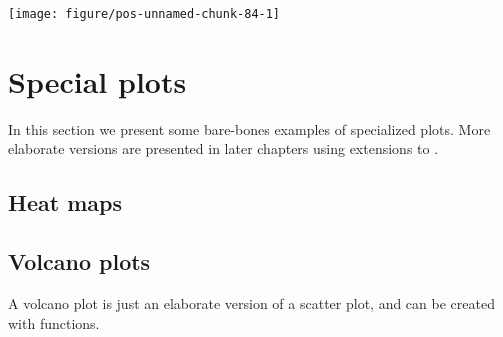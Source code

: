 \documentclass[paper=a4,headsepline,BCOR=12mm,twoside,open=right,%
titlepage,headings=small,fontsize=10pt,index=totoc,bibliography=totoc,%
captions=tableheading,captions=nooneline]{scrbook}\usepackage{knitr}
\begin{document}
\begin{knitrout}\footnotesize
{}\color{fgcolor}\begin{kframe}
\begin{alltt}
    \hlopt{+}
  \hlstd{(} \hlstd{=} \hlstd{)} \hlopt{+}
  \hlstd{(} \hlstd{=} \hlstd{,}  \hlstd{=} \hlstd{(}\hlstd{),}
              \hlstd{=} \hlstd{,}  \hlstd{=} \hlstd{)}
\end{alltt}
\end{kframe}

{\centering \texttt{[image: figure/pos-unnamed-chunk-84-1]} 

}



\end{knitrout}

\section{Special plots}

In this section we present some bare-bones examples of specialized plots. More elaborate versions are presented in later chapters using extensions to \ggplot.

\subsection{Heat maps}



\subsection{Volcano plots}

A volcano plot is just an elaborate version of a scatter plot, and can be created with \ggplot functions.

\begin{knitrout}\footnotesize
{}\color{fgcolor}\begin{kframe}
\begin{alltt}
 \hlkwb{<-} 
\end{alltt}
\end{kframe}
\end{knitrout}
\end{document}
